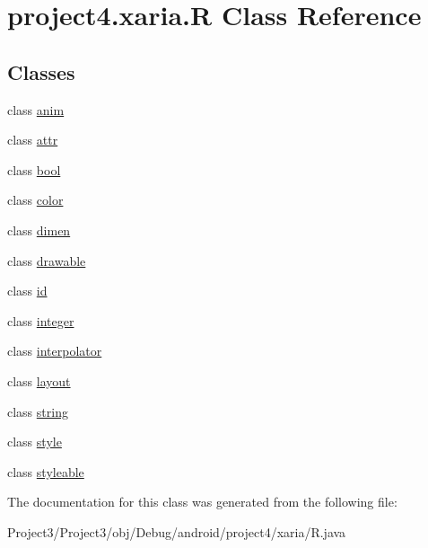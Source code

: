 \hypertarget{classproject4_1_1xaria_1_1R}{}\section{project4.\+xaria.\+R Class Reference}
\label{classproject4_1_1xaria_1_1R}
\subsection*{Classes}
\begin{DoxyCompactItemize}
\item 
class \hyperlink{classproject4_1_1xaria_1_1R_1_1anim}{anim}
\item 
class \hyperlink{classproject4_1_1xaria_1_1R_1_1attr}{attr}
\item 
class \hyperlink{classproject4_1_1xaria_1_1R_1_1bool}{bool}
\item 
class \hyperlink{classproject4_1_1xaria_1_1R_1_1color}{color}
\item 
class \hyperlink{classproject4_1_1xaria_1_1R_1_1dimen}{dimen}
\item 
class \hyperlink{classproject4_1_1xaria_1_1R_1_1drawable}{drawable}
\item 
class \hyperlink{classproject4_1_1xaria_1_1R_1_1id}{id}
\item 
class \hyperlink{classproject4_1_1xaria_1_1R_1_1integer}{integer}
\item 
class \hyperlink{classproject4_1_1xaria_1_1R_1_1interpolator}{interpolator}
\item 
class \hyperlink{classproject4_1_1xaria_1_1R_1_1layout}{layout}
\item 
class \hyperlink{classproject4_1_1xaria_1_1R_1_1string}{string}
\item 
class \hyperlink{classproject4_1_1xaria_1_1R_1_1style}{style}
\item 
class \hyperlink{classproject4_1_1xaria_1_1R_1_1styleable}{styleable}
\end{DoxyCompactItemize}


The documentation for this class was generated from the following file\+:\begin{DoxyCompactItemize}
\item 
Project3/\+Project3/obj/\+Debug/android/project4/xaria/R.\+java\end{DoxyCompactItemize}
